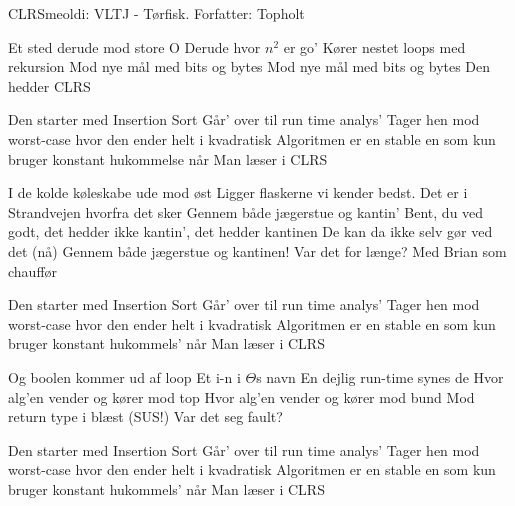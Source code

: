 \begin{sang}{CLRS}{meoldi: VLTJ - Tørfisk. Forfatter: Topholt}
\begin{vers}
Et sted derude mod store O
Derude hvor $n^2$ er go'
Kører nestet loops med rekursion
Mod nye mål med bits og bytes
Mod nye mål med bits og bytes
Den hedder CLRS
\end{vers}
\begin{omkvaed}
Den starter med Insertion Sort
Går' over til run time analys' 
Tager hen mod worst-case hvor den ender helt i kvadratisk
Algoritmen er en stable en som kun bruger konstant hukommelse når
Man læser i CLRS
\end{omkvaed}
\begin{vers}
I de kolde køleskabe ude mod øst
Ligger flaskerne vi kender bedst.
Det er i Strandvejen hvorfra det sker
Gennem både jægerstue og kantin'
Bent, du ved godt, det hedder ikke kantin', det hedder kantinen
De kan da ikke selv gør ved det (nå)
Gennem både jægerstue og kantinen!
Var det for længe?
Med Brian som chauffør
\end{vers}
\begin{omkvaed}
Den starter med Insertion Sort
Går' over til run time analys' 
Tager hen mod worst-case hvor den ender helt i kvadratisk
Algoritmen er en stable en som kun bruger konstant hukommels' når
Man læser i CLRS
\end{omkvaed}
\begin{vers}
Og boolen kommer ud af loop
Et i-n i $\Theta$s navn
En dejlig run-time synes de
Hvor alg'en vender og kører mod top
Hvor alg'en vender og kører mod bund
Mod return type i blæst (SUS!)
Var det seg fault?
\end{vers}
\begin{omkvaed}
Den starter med Insertion Sort
Går' over til run time analys' 
Tager hen mod worst-case hvor den ender helt i kvadratisk
Algoritmen er en stable en som kun bruger konstant hukommels' når
Man læser i CLRS
\end{omkvaed}
\end{sang}
